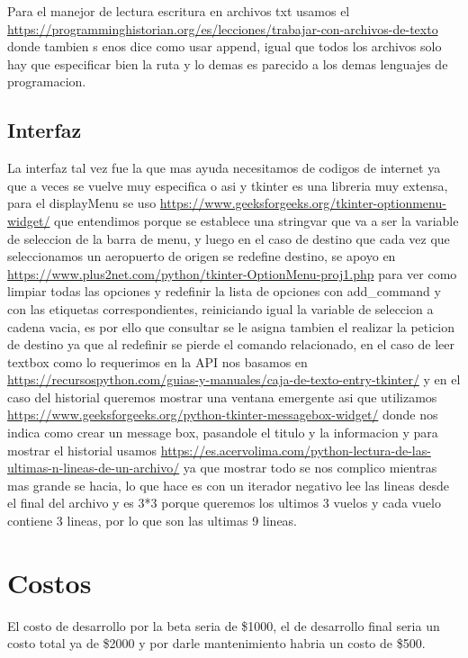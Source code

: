 \documentclass[12pt]{article}
\begin{document}
Para el manejor de lectura escritura en archivos txt usamos el \url{https://programminghistorian.org/es/lecciones/trabajar-con-archivos-de-texto} donde tambien s enos dice como usar append, igual que todos los archivos solo hay que especificar bien la ruta y lo demas es parecido a los demas lenguajes de programacion.

\subsection{Interfaz}
La interfaz tal vez fue la que mas ayuda necesitamos de codigos de internet ya que a veces se vuelve muy especifica o asi y tkinter es una libreria muy extensa, para el displayMenu se uso \url{https://www.geeksforgeeks.org/tkinter-optionmenu-widget/} que entendimos porque se establece una stringvar que va a ser la variable de seleccion de la barra de menu, y luego en el caso de destino que cada vez que seleccionamos un aeropuerto de origen se redefine destino, se apoyo en \url{https://www.plus2net.com/python/tkinter-OptionMenu-proj1.php} para ver como limpiar todas las opciones y redefinir la lista de opciones con add_command y con las etiquetas correspondientes, reiniciando igual la variable de seleccion a cadena vacia, es por ello que consultar se le asigna tambien el realizar la peticion de destino ya que al redefinir se pierde el comando relacionado, en el caso de leer textbox como lo requerimos en la API nos basamos en \url{https://recursospython.com/guias-y-manuales/caja-de-texto-entry-tkinter/} y en el caso del historial queremos mostrar una ventana emergente asi que utilizamos \url{https://www.geeksforgeeks.org/python-tkinter-messagebox-widget/} donde nos indica como crear un message box, pasandole el titulo y la informacion y para mostrar el historial usamos \url{https://es.acervolima.com/python-lectura-de-las-ultimas-n-lineas-de-un-archivo/} ya que mostrar todo se nos complico mientras mas grande se hacia, lo que hace es con un iterador negativo lee las lineas desde el final del archivo y es 3*3 porque queremos los ultimos 3 vuelos y cada vuelo contiene 3 lineas, por lo que son las ultimas 9 lineas.
\section{Costos}
El costo de desarrollo por la beta seria de \$1000, el de desarrollo final seria un costo total ya de \$2000 y por darle mantenimiento habria un costo de \$500.
\end{document}
